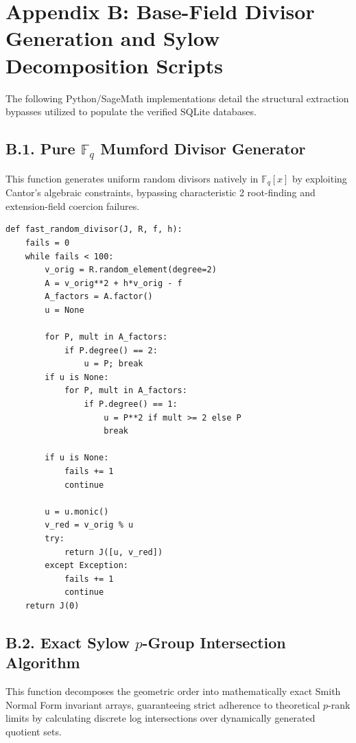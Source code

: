 \documentclass[letterpaper, 11pt]{article}
\begin{document}
\section{Appendix B: Base-Field Divisor Generation and Sylow Decomposition Scripts}
The following Python/SageMath implementations detail the structural extraction bypasses utilized to populate the verified SQLite databases. 

\subsection{B.1. Pure $\mathbb{F}_q$ Mumford Divisor Generator}
This function generates uniform random divisors natively in $\mathbb{F}_q[x]$ by exploiting Cantor's algebraic constraints, bypassing characteristic 2 root-finding and extension-field coercion failures.

\begin{verbatim}
def fast_random_divisor(J, R, f, h):
    fails = 0
    while fails < 100:
        v_orig = R.random_element(degree=2)
        A = v_orig**2 + h*v_orig - f
        A_factors = A.factor()
        u = None
        
        for P, mult in A_factors:
            if P.degree() == 2:
                u = P; break
        if u is None:
            for P, mult in A_factors:
                if P.degree() == 1:
                    u = P**2 if mult >= 2 else P
                    break
                    
        if u is None:
            fails += 1
            continue
            
        u = u.monic()
        v_red = v_orig % u
        try:
            return J([u, v_red])
        except Exception:
            fails += 1
            continue
    return J(0) 
\end{verbatim}

\subsection{B.2. Exact Sylow $p$-Group Intersection Algorithm}
This function decomposes the geometric order into mathematically exact Smith Normal Form invariant arrays, guaranteeing strict adherence to theoretical $p$-rank limits by calculating discrete log intersections over dynamically generated quotient sets.
\end{document}

